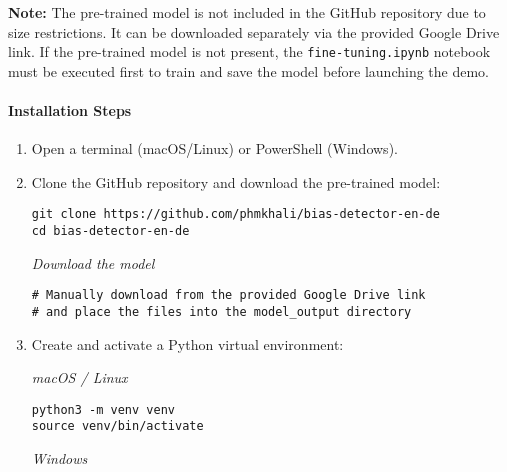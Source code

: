    \textbf{Note:} The pre-trained model is not included in the GitHub repository due to size restrictions. It can be downloaded separately via the provided Google Drive link. If the pre-trained model is not present, the \texttt{fine-tuning.ipynb} notebook must be executed first to train and save the model before launching the demo.
   
\paragraph{Installation Steps}

\begin{enumerate}
    \item Open a terminal (macOS/Linux) or PowerShell (Windows).
    
    \item Clone the GitHub repository and download the pre-trained model:
        
    \begin{tcolorbox}[colback=gray!10, colframe=gray!50, breakable, boxrule=0.4pt, sharp corners]
\begin{verbatim}
git clone https://github.com/phmkhali/bias-detector-en-de
cd bias-detector-en-de
\end{verbatim}
    \end{tcolorbox}
    
    \textit{Download the model}
    
    \begin{tcolorbox}[colback=gray!10, colframe=gray!50, breakable, boxrule=0.4pt, sharp corners]
\begin{verbatim}
# Manually download from the provided Google Drive link
# and place the files into the model_output directory
\end{verbatim}
    \end{tcolorbox}
    
    \item Create and activate a Python virtual environment:
    
    \textit{macOS / Linux}
    
    \begin{tcolorbox}[colback=gray!10, colframe=gray!50, breakable, boxrule=0.4pt, sharp corners]
\begin{verbatim}
python3 -m venv venv
source venv/bin/activate
\end{verbatim}
    \end{tcolorbox}
    
    \textit{Windows}
    

\end{enumerate}

